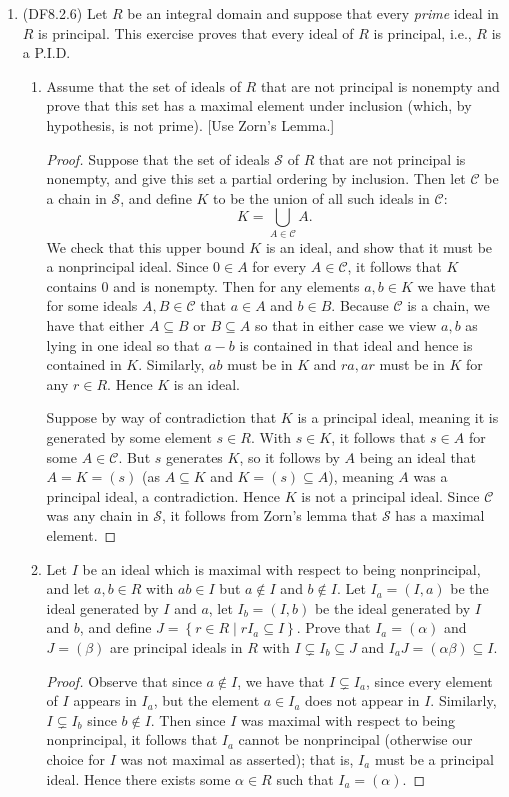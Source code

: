\documentclass[11pt]{article}
\newcommand{\cbr}[1]{\left\{#1\right\}}
\begin{document}
\begin{enumerate}
    \item (DF8.2.6) Let $R$ be an integral domain and suppose that every \textit{prime} ideal in $R$ is principal. This exercise proves that every ideal of $R$ is principal, i.e., $R$ is a P.I.D. \begin{enumerate}
        \item Assume that the set of ideals of $R$ that are not principal is nonempty and prove that this set has a maximal element under inclusion (which, by hypothesis, is not prime). [Use Zorn's Lemma.]
        \begin{proof}
            Suppose that the set of ideals $\mathcal{S}$ of $R$ that are not principal is nonempty, and give this set a partial ordering by inclusion. Then let $\mathcal{C}$ be a chain in $\mathcal{S}$, and define $K$ to be the union of all such ideals in $\mathcal{C}$: \[K = \bigcup_{A\in \mathcal{C}}A.\] We check that this upper bound $K$ is an ideal, and show that it must be a nonprincipal ideal. Since $0\in A$ for every $A\in \mathcal{C}$, it follows that $K$ contains $0$ and is nonempty. Then for any elements $a,b\in K$ we have that for some ideals $A,B\in \mathcal{C}$ that $a\in A$ and $b\in B$. Because $\mathcal{C}$ is a chain, we have that either $A\subseteq B$ or $B\subseteq A$ so that in either case we view $a,b$ as lying in one ideal so that $a-b$ is contained in that ideal and hence is contained in $K$. Similarly, $ab$ must be in $K$ and $ra, ar$ must be in $K$ for any $r\in R$. Hence $K$ is an ideal.

            Suppose by way of contradiction that $K$ is a principal ideal, meaning it is generated by some element $s\in R$. With $s\in K$, it follows that $s\in A$ for some $A\in \mathcal{C}$. But $s$ generates $K$, so it follows by $A$ being an ideal that $A = K = (s)$ (as $A\subseteq K$ and $K = (s)\subseteq A$), meaning $A$ was a principal ideal, a contradiction. Hence $K$ is not a principal ideal. Since $\mathcal{C}$ was any chain in $\mathcal{S}$, it follows from Zorn's lemma that $\mathcal{S}$ has a maximal element.
        \end{proof}
        \item Let $I$ be an ideal which is maximal with respect to being nonprincipal, and let $a,b\in R$ with $ab\in I$ but $a\not\in I$ and $b\not\in I$. Let $I_a = (I,a)$ be the ideal generated by $I$ and $a$, let $I_b = (I,b)$ be the ideal generated by $I$ and $b$, and define $J = \cbr{r\in R\mid rI_a\subseteq I}$. Prove that $I_a = (\alpha)$ and $J = (\beta)$ are principal ideals in $R$ with $I\subsetneq I_b\subseteq J$ and $I_aJ = (\alpha\beta)\subseteq I$.
        \begin{proof}
            Observe that since $a\not\in I$, we have that $I\subsetneq I_a$, since every element of $I$ appears in $I_a$, but the element $a\in I_a$ does not appear in $I$. Similarly, $I\subsetneq I_b$ since $b\not\in I$. Then since $I$ was maximal with respect to being nonprincipal, it follows that $I_a$ cannot be nonprincipal (otherwise our choice for $I$ was not maximal as asserted); that is, $I_a$ must be a principal ideal. Hence there exists some $\alpha \in R$ such that $I_a = (\alpha)$. 


\end{proof}
\end{enumerate}
\end{enumerate}
\end{document}
